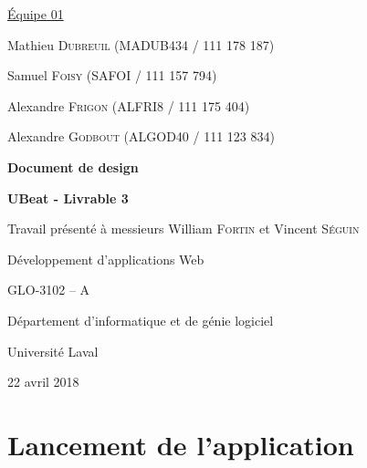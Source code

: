 \documentclass[12pt, letterpaper]{article}
\begin{document}
    \begin{titlepage}
        {\setlength{\parindent}{0pt}
            \underline{Équipe 01} \par
            Mathieu \textsc{Dubreuil} (MADUB434 / 111 178 187) \par
            Samuel \textsc{Foisy} (SAFOI / 111 157 794) \par
            Alexandre \textsc{Frigon} (ALFRI8 / 111 175 404) \par
            Alexandre \textsc{Godbout} (ALGOD40 / 111 123 834) \par
        }

        \begin{center}
            \vspace{4cm}
            {\Large\textbf{Document de design} \par}
            {\large\textbf{UBeat - Livrable 3} \par}

            \vspace{2cm}
            {\large Travail présenté à messieurs William \textsc{Fortin} et Vincent \textsc{Séguin} \par}

            \vspace{1.25cm}
            {\large
                Développement d'applications Web \par
                GLO-3102 -- A \par
            }

            \vfill
            Département d’informatique et de génie logiciel \par
            Université Laval \par
            22 avril 2018 \par
        \end{center}
    \end{titlepage}
    
    \section*{Lancement de l'application}
\end{document}
